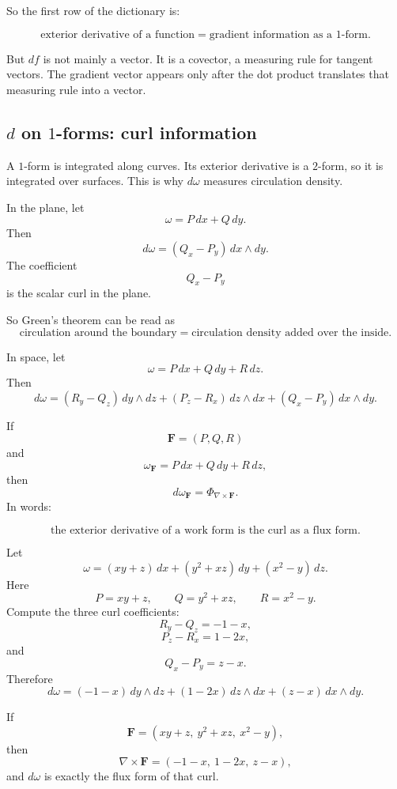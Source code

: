 So the first row of the dictionary is:

\[
\boxed{
    \text{exterior derivative of a function}
    =
    \text{gradient information as a \(1\)-form}.
}
\]

But \(df\) is not mainly a vector.  It is a covector, a measuring rule for tangent
vectors.  The gradient vector appears only after the dot product translates that
measuring rule into a vector.

\subsection{\texorpdfstring{\(d\)}{d} on \texorpdfstring{\(1\)}{1}-forms:
curl information}

A \(1\)-form is integrated along curves.  Its exterior derivative is a \(2\)-form, so it is
integrated over surfaces.  This is why \(d\omega\) measures circulation density.

In the plane, let
\[
    \omega=P\,dx+Q\,dy.
\]
Then
\[
\boxed{
    d\omega=(Q_x-P_y)\,dx\wedge dy.
}
\]
The coefficient
\[
    Q_x-P_y
\]
is the scalar curl in the plane.

So Green's theorem can be read as
\[
    \text{circulation around the boundary}
    =
    \text{circulation density added over the inside}.
\]

In space, let
\[
    \omega=P\,dx+Q\,dy+R\,dz.
\]
Then
\[
\boxed{
    d\omega
    =
    (R_y-Q_z)\,dy\wedge dz
    +
    (P_z-R_x)\,dz\wedge dx
    +
    (Q_x-P_y)\,dx\wedge dy.
}
\]

If
\[
    \mathbf F=(P,Q,R)
\]
and
\[
    \omega_{\mathbf F}=P\,dx+Q\,dy+R\,dz,
\]
then
\[
\boxed{
    d\omega_{\mathbf F}=\Phi_{\nabla\times\mathbf F}.
}
\]
In words:

\[
\boxed{
    \text{the exterior derivative of a work form is the curl as a flux form.}
}
\]

\begin{example}
Let
\[
    \omega=(xy+z)\,dx+(y^2+xz)\,dy+(x^2-y)\,dz.
\]
Here
\[
    P=xy+z,
    \qquad
    Q=y^2+xz,
    \qquad
    R=x^2-y.
\]
Compute the three curl coefficients:
\[
    R_y-Q_z=-1-x,
\]
\[
    P_z-R_x=1-2x,
\]
and
\[
    Q_x-P_y=z-x.
\]
Therefore
\[
\boxed{
    d\omega
    =
    (-1-x)\,dy\wedge dz
    +
    (1-2x)\,dz\wedge dx
    +
    (z-x)\,dx\wedge dy.
}
\]

If
\[
    \mathbf F=(xy+z,\ y^2+xz,\ x^2-y),
\]
then
\[
    \nabla\times\mathbf F=(-1-x,\ 1-2x,\ z-x),
\]
and \(d\omega\) is exactly the flux form of that curl.
\end{example}

